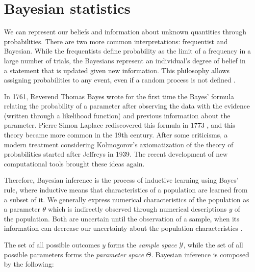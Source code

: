 \section{Bayesian statistics}
\label{sec:bayesian_statistics}

We can represent our beliefs and information about unknown quantities 
through probabilities. There are two more common interpretations: 
frequentist and Bayesian. While the frequentists define
probability as the limit of a frequency in a large number of trials, the
Bayesians represent an individual's degree of belief in a statement that is
updated given new information. This philosophy allows assigning probabilities
to any event, even if a random process is not defined \cite{statisticat2016laplacesdemon}. 

In 1761, Reverend Thomas Bayes wrote for the first time the Bayes' formula
relating the probability of a parameter after observing the data with the
evidence (written through a likelihood function) and previous information
about the parameter. Pierre Simon Laplace rediscovered this formula in 1773
\cite{Robert2007}, and this theory became more common in the 19th century.
After some criticisms, a modern treatment considering Kolmogorov's
axiomatization of the theory of probabilities started after Jeffreys in 1939.
The recent development of new computational tools brought these ideas again.

Therefore, Bayesian inference is the process of inductive learning using
Bayes' rule, where inductive means that characteristics of a population are 
learned from a subset of it. We generally
express numerical characteristics of the population as a parameter $\theta$ which is
indirectly observed through numerical descriptions $y$ of the population. Both are
uncertain until the observation of a sample, when its information can decrease
our uncertainty about the population characteristics \cite[p. 1-2]{hoff2009first}.

The set of all possible outcomes $y$ forms the {\em sample space}
$\mathcal{Y}$, while the set of all possible parameters forms the {\em
parameter space} $\Theta$. Bayesian inference is composed by the following: 

